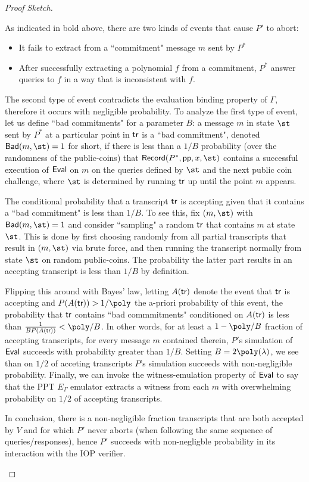 \begin{proof}[Proof Sketch]
\begin{itemize}
As indicated in bold above, there are two kinds of events that cause $P'$ to abort: 
\begin{itemize}
\item It fails to extract from a ``commitment" message $m$ sent by $P^*$
\item After successfully extracting a polynomial $f$ from a commitment, $P^*$ answer queries to $f$ in a way that is inconsistent with $f$. 
\end{itemize}

The second type of event contradicts the evaluation binding property of $\Gamma$, therefore it occurs with negligible probability. To analyze the first type of event, let us define ``bad commitments" for a parameter $B$: a message $m$ in state $\st$ sent by $P^*$ at a particular point in $\textsf{{tr}}$ is a ``bad commitment", denoted $\pro{Bad}(m, \st) = 1$ for short, if there is less than a $1/B$ probability (over the randomness of the public-coins) that $\pro{Record}(P^*, \params, x, \st)$ contains a successful execution of $\textsf{{Eval}}$ on $m$ on the queries defined by $\st$ and the next public coin challenge, where $\st$ is determined by running $\textsf{{tr}}$ up until the point $m$ appears. 

The conditional probability that a transcript $\textsf{{tr}}$ is accepting given that it contains a ``bad commitment" is less than $1/B$. To see this, fix $(m, \st)$ with $\pro{Bad}(m, \st) = 1$ and consider ``sampling" a random $\textsf{{tr}}$ that contains $m$ at state $\st$. This is done by first choosing randomly from all partial transcripts that result in $(m, \st)$ via brute force, and then running the transcript normally from state $\st$ on random public-coins. The probability the latter part results in an accepting transcript is less than $1/B$ by definition.

Flipping this around with Bayes' law, letting $A(\textsf{{tr}})$ denote the event that $\textsf{{tr}}$ is accepting and $P(A(\tr)) > 1/\poly$ the a-priori probability of this event, the probability that $\textsf{{tr}}$ contains ``bad commmitments" conditioned on $A(\textsf{{tr}})$ is less than $\frac{1}{B P(A(\tr))} < \poly/B$. In other words, for at least a $1 - \poly/B$ fraction of accepting transcripts, for every message $m$ contained therein, $P'$s simulation of $\textsf{{Eval}}$ succeeds with probability greater than $1/B$. Setting $B = 2 \poly(\lambda)$, we see than on $1/2$ of acceting transcripts $P$'s simulation succeeds with non-negligible probability. Finally, we can invoke the witness-emulation property of $\textsf{{Eval}}$ to say that the PPT $E_\Gamma$ emulator extracts a witness from each $m$ with overwhelming probability on $1/2$ of accepting transcripts. 

In conclusion, there is a non-negligible fraction transcripts that are both accepted by $V$ and for which $P'$ never aborts (when following the same sequence of queries/responses), hence $P'$ succeeds with non-negligble probability in its interaction with the IOP verifier. 

\end{itemize}
\end{proof}


